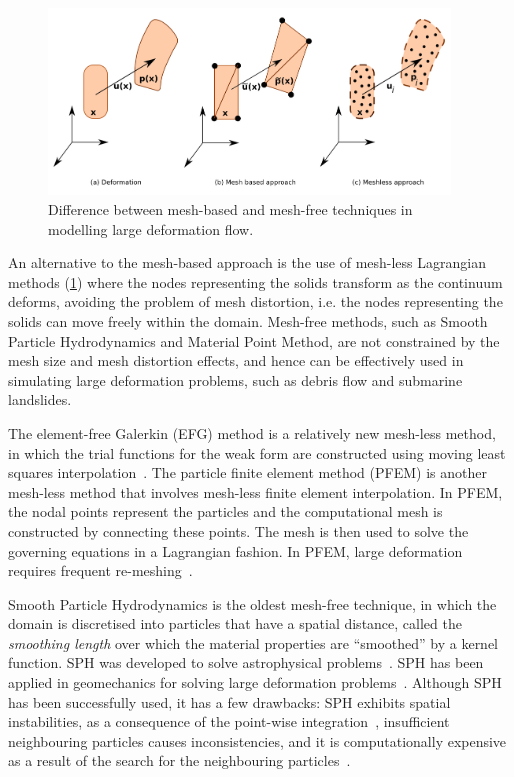 \begin{figure}[tbhp]
\centering
\includegraphics[width=0.95\textwidth]{NumericalMethods}
\caption{Difference between mesh-based and mesh-free techniques in modelling 
large deformation flow.}
\label{fig:NumericalMethods}
\end{figure}

An alternative to the mesh-based approach is the use of mesh-less Lagrangian 
methods 
(\cref{fig:NumericalMethods}) where the nodes representing the solids transform 
as the continuum deforms, avoiding the problem of mesh distortion, i.e. the 
nodes representing the solids can move freely within the domain. Mesh-free 
methods, such as Smooth Particle Hydrodynamics and Material Point Method, are 
not constrained by the mesh size and mesh distortion effects, and hence can be 
effectively used in simulating large deformation problems, such as debris flow 
and submarine landslides.

The element-free Galerkin (EFG) method is a relatively new mesh-less 
method, in which the trial functions for the weak form are constructed using 
moving least squares interpolation~\citep{Belytschko1994}. The particle finite 
element method (PFEM) is another mesh-less method that involves mesh-less 
finite element interpolation. In PFEM, the nodal points represent the 
particles and the computational mesh is constructed by connecting these points. 
The mesh is then used to solve the governing equations in a Lagrangian fashion. 
In PFEM, large deformation requires frequent re-meshing~\citep{Kafaji2013}.

Smooth Particle Hydrodynamics is the oldest mesh-free technique, in which the 
domain is discretised into particles that have a spatial distance, called the 
\textit{smoothing length} over which the material properties are ``smoothed'' 
by a kernel function. SPH was developed to solve astrophysical 
problems~\citep{Monaghan2005}. SPH has been applied in geomechanics for solving 
large deformation problems~\citep{Augarde2009,Maeda2010,Mori2008}. Although SPH 
has been successfully used, it has a few drawbacks: SPH exhibits spatial 
instabilities, as a consequence of the point-wise 
integration~\citep{Bonet2000}, insufficient neighbouring particles causes 
inconsistencies, and it is computationally expensive as a result of the search 
for the neighbouring particles~\citep{Bandara2013}.

